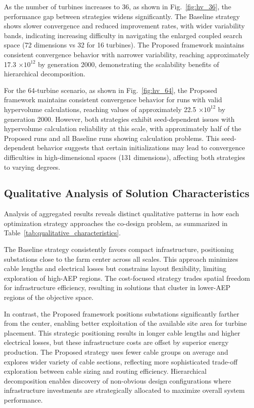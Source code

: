 \documentclass[format=sigconf,anonymous=true,review=true]{acmart}
\begin{document}
As the number of turbines increases to 36, as shown in Fig.~\ref{fig:hv_36}, the performance gap between strategies widens significantly. The Baseline strategy shows slower convergence and reduced improvement rates, with wider variability bands, indicating increasing difficulty in navigating the enlarged coupled search space (72 dimensions vs 32 for 16 turbines). The Proposed framework maintains consistent convergence behavior with narrower variability, reaching approximately 17.3 $\times 10^{12}$ by generation 2000, demonstrating the scalability benefits of hierarchical decomposition.

For the 64-turbine scenario, as shown in Fig.~\ref{fig:hv_64}, the Proposed framework maintains consistent convergence behavior for runs with valid hypervolume calculations, reaching values of approximately 22.5 $\times 10^{12}$ by generation 2000. However, both strategies exhibit seed-dependent issues with hypervolume calculation reliability at this scale, with approximately half of the Proposed runs and all Baseline runs showing calculation problems. This seed-dependent behavior suggests that certain initializations may lead to convergence difficulties in high-dimensional spaces (131 dimensions), affecting both strategies to varying degrees.



\subsection{Qualitative Analysis of Solution Characteristics}
Analysis of aggregated results reveals distinct qualitative patterns in how each optimization strategy approaches the co-design problem, as summarized in Table~\ref{tab:qualitative_characteristics}.

The Baseline strategy consistently favors compact infrastructure, positioning substations close to the farm center across all scales. This approach minimizes cable lengths and electrical losses but constrains layout flexibility, limiting exploration of high-AEP regions. The cost-focused strategy trades spatial freedom for infrastructure efficiency, resulting in solutions that cluster in lower-AEP regions of the objective space.

In contrast, the Proposed framework positions substations significantly farther from the center, enabling better exploitation of the available site area for turbine placement. This strategic positioning results in longer cable lengths and higher electrical losses, but these infrastructure costs are offset by superior energy production. The Proposed strategy uses fewer cable groups on average and explores wider variety of cable sections, reflecting more sophisticated trade-off exploration between cable sizing and routing efficiency. Hierarchical decomposition enables discovery of non-obvious design configurations where infrastructure investments are strategically allocated to maximize overall system performance.
\end{document}
